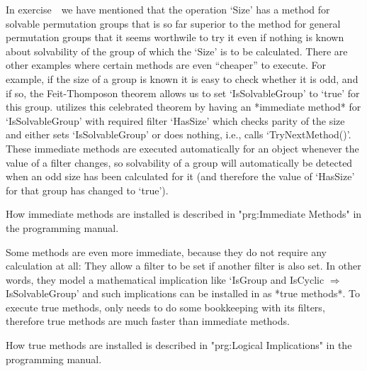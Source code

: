 %
In exercise~\solsimsex\ we have mentioned that the operation `Size' has a
method  for solvable permutation  groups that is  so  far superior to the
method for  general permutation groups that  it seems worthwile to try it
even if nothing  is  known about solvability   of the group of which  the
`Size' is to   be  calculated. There are   other  examples where  certain
methods  are even ``cheaper'' to  execute. For example,  if the size of a
group is known  it is easy to check  whether  it is  odd, and  if so, the
Feit-Thomposon  theorem allows us to set  `IsSolvableGroup' to `true' for
this group.   {\GAP} utilizes   this  celebrated  theorem  by  having  an
*immediate  method* for `IsSolvableGroup'  with required filter `HasSize'
which checks parity of the size and either sets `IsSolvableGroup' or does
nothing, i.e.,   calls `TryNextMethod()'.   These immediate  methods  are
executed  automatically for an  object  whenever the   value of a  filter
changes, so solvability of a group will automatically be detected when an
odd size has been calculated for it (and therefore the value of `HasSize'
for that group has changed to `true').

How immediate methods  are  installed   is described in    "prg:Immediate
Methods" in the programming manual.

Some methods are  even more immediate,   because they do not  require any
calculation  at all: They  allow a filter to  be set if another filter is
also set. In other words,   they  model a mathematical implication   like
`IsGroup   and   IsCyclic    $\Rightarrow$   IsSolvableGroup'  and   such
implications  can be installed  in {\GAP}  as  *true methods*. To execute
true methods, {\GAP} only needs to do  some bookkeeping with its filters,
therefore true methods are much faster than immediate methods.

How true methods are installed is described in "prg:Logical Implications"
in the programming manual.

\null


